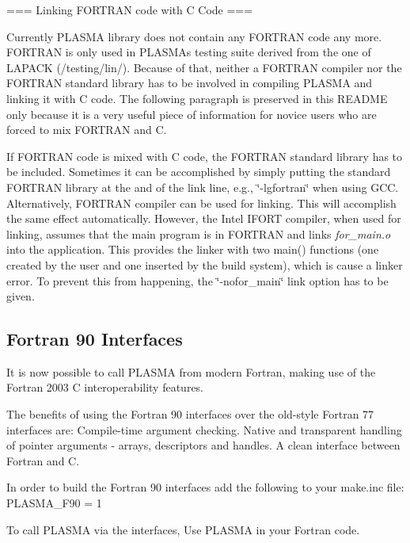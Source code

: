 === Linking F\+O\+R\+T\+R\+A\+N code with C Code ===

Currently P\+L\+A\+S\+M\+A library does not contain any F\+O\+R\+T\+R\+A\+N code any more. F\+O\+R\+T\+R\+A\+N is only used in P\+L\+A\+S\+M\+A\textquotesingle{}s testing suite derived from the one of L\+A\+P\+A\+C\+K (/testing/lin/). Because of that, neither a F\+O\+R\+T\+R\+A\+N compiler nor the F\+O\+R\+T\+R\+A\+N standard library has to be involved in compiling P\+L\+A\+S\+M\+A and linking it with C code. The following paragraph is preserved in this R\+E\+A\+D\+M\+E only because it is a very useful piece of information for novice users who are forced to mix F\+O\+R\+T\+R\+A\+N and C.

If F\+O\+R\+T\+R\+A\+N code is mixed with C code, the F\+O\+R\+T\+R\+A\+N standard library has to be included. Sometimes it can be accomplished by simply putting the standard F\+O\+R\+T\+R\+A\+N library at the and of the link line, e.\+g., \char`\"{}-\/lgfortran\char`\"{} when using G\+C\+C. Alternatively, F\+O\+R\+T\+R\+A\+N compiler can be used for linking. This will accomplish the same effect automatically. However, the Intel I\+F\+O\+R\+T compiler, when used for linking, assumes that the main program is in F\+O\+R\+T\+R\+A\+N and links {\itshape for\+\_\+main.\+o} into the application. This provides the linker with two main() functions (one created by the user and one inserted by the build system), which is cause a linker error. To prevent this from happening, the \char`\"{}-\/nofor\+\_\+main\char`\"{} link option has to be given.

\subsection*{Fortran 90 Interfaces }

It is now possible to call P\+L\+A\+S\+M\+A from modern Fortran, making use of the Fortran 2003 C interoperability features.

The benefits of using the Fortran 90 interfaces over the old-\/style Fortran 77 interfaces are\+: Compile-\/time argument checking. Native and transparent handling of pointer arguments -\/ arrays, descriptors and handles. A clean interface between Fortran and C.

In order to build the Fortran 90 interfaces add the following to your make.\+inc file\+: P\+L\+A\+S\+M\+A\+\_\+\+F90 = 1

To call P\+L\+A\+S\+M\+A via the interfaces, \textquotesingle{}Use P\+L\+A\+S\+M\+A\textquotesingle{} in your Fortran code.

